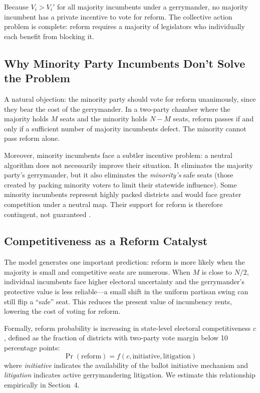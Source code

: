 Because $V_i > V_i'$ for all majority incumbents under a gerrymander, no majority incumbent has a private incentive to vote for reform. The collective action problem is complete: reform requires a majority of legislators who individually each benefit from blocking it.

\subsection{Why Minority Party Incumbents Don't Solve the Problem}

A natural objection: the minority party should vote for reform unanimously, since they bear the cost of the gerrymander. In a two-party chamber where the majority holds $M$ seats and the minority holds $N - M$ seats, reform passes if and only if a sufficient number of majority incumbents defect. The minority cannot pass reform alone.

Moreover, minority incumbents face a subtler incentive problem: a neutral algorithm does not necessarily improve their situation. It eliminates the majority party's gerrymander, but it also eliminates the \emph{minority's} safe seats (those created by packing minority voters to limit their statewide influence). Some minority incumbents represent highly packed districts and would face greater competition under a neutral map. Their support for reform is therefore contingent, not guaranteed \citep{grofman2004}.

\subsection{Competitiveness as a Reform Catalyst}

The model generates one important prediction: reform is more likely when the majority is small and competitive seats are numerous. When $M$ is close to $N/2$, individual incumbents face higher electoral uncertainty and the gerrymander's protective value is less reliable---a small shift in the uniform partisan swing can still flip a ``safe'' seat. This reduces the present value of incumbency rents, lowering the cost of voting for reform.

Formally, reform probability is increasing in state-level electoral competitiveness $c$, defined as the fraction of districts with two-party vote margin below 10 percentage points:
\begin{equation}
  \Pr(\text{reform}) = f(c, \text{initiative}, \text{litigation})
  \label{eq:reform-prob}
\end{equation}
where \textit{initiative} indicates the availability of the ballot initiative mechanism and \textit{litigation} indicates active gerrymandering litigation. We estimate this relationship empirically in Section~4.

